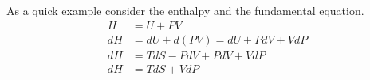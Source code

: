 \documentclass{article}
\begin{document}
As a quick example consider the enthalpy and the fundamental equation. 
\begin{equation}
    \begin{split}
        H &= U + PV \\
        dH &= dU + d(PV) = dU + PdV + VdP \\
        dH &= TdS - PdV + PdV + VdP \\
        dH &= TdS + VdP
    \end{split}
\end{equation}
\end{document}

